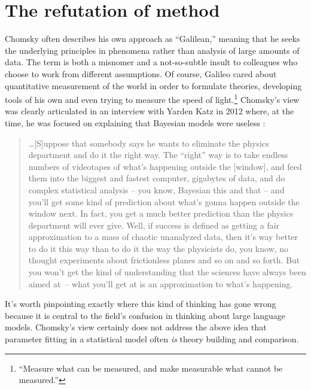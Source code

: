 \documentclass[output=paper,colorlinks,citecolor=brown
]{langscibook}
\begin{document}

\section{The refutation of method}

Chomsky often describes his own approach as ``Galilean,'' meaning that he seeks the underlying principles in phenomena rather than analysis of large amounts of data. The term is both a misnomer \citep{behme2014galilean} and a not-so-subtle insult to colleagues who choose to work from different assumptions. Of course,  Galileo cared about quantitative measurement of the world in order to formulate theories, developing tools of his own and even trying to measure the speed of light.\footnote{ ``Measure what can be measured, and make measurable what cannot be measured.''} Chomsky's view was clearly articulated in an interview with Yarden Katz in 2012 where, at the time, he was focused on explaining that Bayesian models were useless \citep{katz2012noam}: 
\begin{quote}
 \ldots  [S]uppose that somebody says he wants to eliminate the physics department and do it the right way. The ``right'' way is to take endless numbers of videotapes of what's happening outside the [window], and feed them into the biggest and fastest computer, gigabytes of data, and do complex statistical analysis -- you know, Bayesian this and that -- and you'll get some kind of prediction about what's gonna happen outside the window next. In fact, you get a much better prediction than the physics department will ever give. Well, if success is defined as getting a fair approximation to a mass of chaotic unanalyzed data, then it's way better to do it this way than to do it the way the physicists do, you know, no thought experiments about frictionless planes and so on and so forth. But you won't get the kind of understanding that the sciences have always been aimed at~– what you'll get at is an approximation to what's happening.
\end{quote}
It's worth pinpointing exactly where this kind of thinking has gone wrong because it is central to the field's confusion in thinking about large language models. Chomsky's view certainly does not address the above idea that parameter fitting in a statistical model often \textit{is} theory building and comparison. %
\end{document}
